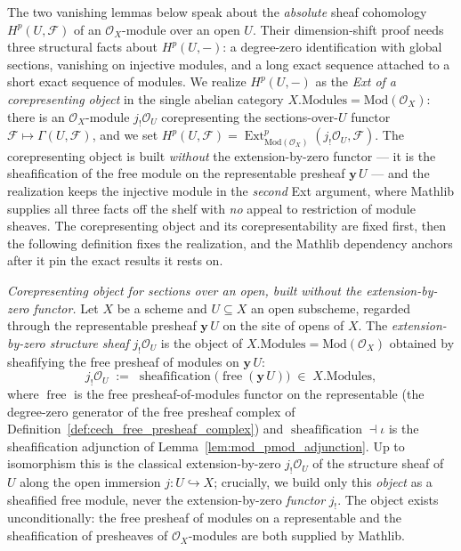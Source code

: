 The two vanishing lemmas below speak about the \emph{absolute} sheaf cohomology
\(H^p(U, \mathcal{F})\) of an \(\mathcal{O}_X\)-module over an open \(U\). Their
dimension-shift proof needs three structural facts about \(H^p(U, -)\): a degree-zero
identification with global sections, vanishing on injective modules, and a long exact
sequence attached to a short exact sequence of modules. We realize \(H^p(U, -)\) as the
\emph{Ext of a corepresenting object} in the single abelian category
\(X.\mathrm{Modules} = \mathrm{Mod}(\mathcal{O}_X)\): there is an
\(\mathcal{O}_X\)-module \(j_!\mathcal{O}_U\) corepresenting the
sections-over-\(U\) functor \(\mathcal{F} \mapsto \Gamma(U, \mathcal{F})\), and we set
\(H^p(U, \mathcal{F}) = \operatorname{Ext}^p_{\mathrm{Mod}(\mathcal{O}_X)}(j_!\mathcal{O}_U,
\mathcal{F})\). The corepresenting object is built \emph{without} the extension-by-zero
functor — it is the sheafification of the free module on the representable presheaf
\(\mathbf{y}\,U\) — and the realization keeps the injective module in the \emph{second}
Ext argument, where Mathlib supplies all three facts off the shelf with \emph{no} appeal
to restriction of module sheaves. The corepresenting object and its corepresentability
are fixed first, then the following definition fixes the realization, and the Mathlib
dependency anchors after it pin the exact results it rests on.

\begin{definition}

  \label{def:jshriek_ou}
  \textit{Corepresenting object for sections over an open, built without the
  extension-by-zero functor.}
  Let \(X\) be a scheme and \(U \subseteq X\) an open subscheme, regarded through the
  representable presheaf \(\mathbf{y}\,U\) on the site of opens of \(X\). The
  \emph{extension-by-zero structure sheaf} \(j_!\mathcal{O}_U\) is the object of
  \(X.\mathrm{Modules} = \mathrm{Mod}(\mathcal{O}_X)\) obtained by sheafifying the free
  presheaf of modules on \(\mathbf{y}\,U\):
  \[
    j_!\mathcal{O}_U \;:=\; \operatorname{sheafification}\bigl(
      \operatorname{free}(\mathbf{y}\,U)\bigr)
    \;\in\; X.\mathrm{Modules},
  \]
  where \(\operatorname{free}\) is the free presheaf-of-modules functor on the
  representable (the degree-zero generator of the free presheaf complex of
  Definition~\ref{def:cech_free_presheaf_complex}) and
  \(\operatorname{sheafification} \dashv \iota\) is the sheafification adjunction of
  Lemma~\ref{lem:mod_pmod_adjunction}. Up to isomorphism this is the classical
  extension-by-zero \(j_!\mathcal{O}_U\) of the structure sheaf of \(U\) along the open
  immersion \(j : U \hookrightarrow X\); crucially, we build only this \emph{object} as a
  sheafified free module, never the extension-by-zero \emph{functor} \(j_!\). The object
  exists unconditionally: the free presheaf of modules on a representable and the
  sheafification of presheaves of \(\mathcal{O}_X\)-modules are both supplied by Mathlib.
\end{definition}

